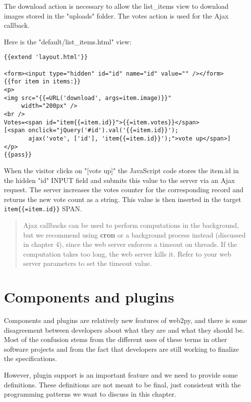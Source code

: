 \documentclass[justified,sixbynine,notoc]{tufte-book}
\def\ft{\small\tt}
\def\inxx#1{\index{#1}}
\begin{document}
\begin{fullwidth}
The download action is necessary to allow the list\_items view to download images stored in the "uploads" folder. The votes action is used for the Ajax callback.

Here is the "default/list\_items.html" view:
\begin{lstlisting}[keywords={}]
{{extend 'layout.html'}}

<form><input type="hidden" id="id" name="id" value="" /></form>
{{for item in items:}}
<p>
<img src="{{=URL('download', args=item.image)}}"
     width="200px" />
<br />
Votes=<span id="item{{=item.id}}">{{=item.votes}}</span>
[<span onclick="jQuery('#id').val('{{=item.id}}');
       ajax('vote', ['id'], 'item{{=item.id}}');">vote up</span>]
</p>
{{pass}}
\end{lstlisting}

When the visitor clicks on "[vote up]" the JavaScript code stores the item.id in the hidden "id" INPUT field and submits this value to the server via an Ajax request. The server increases the votes counter for the corresponding record and returns the new vote count as a string. This value is then inserted in the target {\ft item\{\{=item.id\}\}} SPAN.

\begin{quote}Ajax callbacks can be used to perform computations in the background, but we recommend using {\bf cron} or a background process instead (discussed in chapter 4), since the web server enforces a timeout on threads. If the computation takes too long, the web server kills it. Refer to your web server parameters to set the timeout value.\end{quote}
\goodbreak\chapter{Components and plugins}

\inxx{component}
\inxx{plugin}

Components and plugins are relatively new features of web2py, and there is some disagreement between developers about what they are and what they should be. Most of the confusion stems from the different uses of these terms in other software projects and from the fact that developers are still working to finalize the specifications.

However, plugin support is an important feature and we need to provide some definitions. These definitions are not meant to be final, just consistent with the programming patterns we want to discuss in this chapter.


\end{fullwidth}
\end{document}
